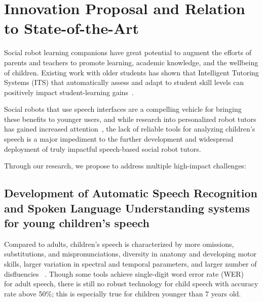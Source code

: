 \section{Innovation Proposal and Relation to State-of-the-Art}
\vspace{-3mm}   
Social robot learning companions have great potential to augment the efforts of parents and teachers to promote learning, academic knowledge, and the wellbeing of children. Existing work with older students has shown that Intelligent Tutoring Systems (ITS) that automatically assess and adapt to student skill levels can positively impact student-learning gains~\cite{desmarais2012review}. 


Social robots that use speech interfaces are a compelling vehicle for bringing these benefits to younger users, and while research into personalized robot tutors has gained increased attention~\cite{leyzberg2014personalizing}, the lack of reliable tools for analyzing children's speech is a major impediment to the further development and widespread deployment of truly impactful speech-based social robot tutors.

Through our research, we propose to address multiple high-impact challenges:

\subsection{Development of Automatic Speech Recognition and Spoken Language Understanding systems for young children's speech}
\label{section_ASR}
Compared to adults, children's speech is characterized by more omissions, substitutions, and mispronunciations, diversity in anatomy and developing motor skills, larger variation in spectral and temporal parameters, and larger number of disfluencies ~\cite{kennedy2017child, fainberg2016improving}. Though some tools achieve single-digit word error rate (WER) ~\cite{saon2015ibm, price2009assessment} for adult speech, there is still no robust technology for child speech with accuracy rate above 50\%; this is especially true for children younger than 7 years old.

